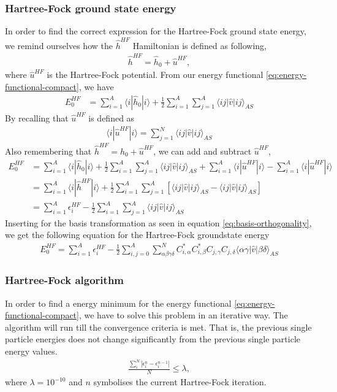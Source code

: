\documentclass[11pt]{article}
\begin{document}
\subsubsection{Hartree-Fock ground state energy}
In order to find the correct expression for the Hartree-Fock ground state energy, we remind ourselves how the $\hat{h}^{HF}$ Hamiltonian is defined as following,
\begin{align*}
	\hat{h}^{HF} = \hat{h}_0 + \hat{u}^{HF},
\end{align*}
where $\hat{u}^{HF}$ is the Hartree-Fock potential. From our energy functional \eqref{eq:energy-functional-compact}, we have
\begin{align*}
	E_0^{HF} &= \sum^A_{i=1} \langle i |\hat{h}_0| i \rangle + \frac{1}{2}\sum^A_{i=1}\sum^A_{j=1} \langle ij |\hat{v}| ij \rangle_{AS}
\end{align*}
By recalling that $\hat{u}^{HF}$ is defined as 
\begin{align*}
	\langle i | \hat{u}^{HF} | i \rangle = \sum_{j=1}^N \langle ij | \hat{v} | ij \rangle_{AS}
\end{align*}
Also remembering that $\hat{h}^{HF} = \hat{h}_0 + \hat{u}^{HF}$, we can add and subtract $\hat{u}^{HF}$,
\begin{align*}
	E_0^{HF} &= \sum^A_{i=1} \langle i |\hat{h}_0| i \rangle + \frac{1}{2}\sum^A_{i=1}\sum^A_{j=1} \langle ij |\hat{v}| ij \rangle_{AS} + \sum^A_{i=1} \langle i | \hat{u}^{HF} | i \rangle - \sum^A_{i=1} \langle i | \hat{u}^{HF} | i \rangle \\
	&= \sum^A_{i=1} \langle i | \hat{h}^{HF} | i \rangle + \frac{1}{2}\sum^A_{i=1}\sum^A_{j=1} \left[ \langle ij |\hat{v}| ij \rangle_{AS} - \langle ij | \hat{v} | ij \rangle_{AS}\right] \\
	&= \sum^A_{i=1} \epsilon_i^{HF} - \frac{1}{2}\sum^A_{i=1}\sum^A_{j=1} \langle ij |\hat{v}| ij \rangle_{AS}
\end{align*}
Inserting for the basis transformation as seen in equation \eqref{eq:basis-orthogonality}, we get the following equation for the Hartree-Fock groundstate energy
\begin{align}
	E_0^{HF} = \sum^A_{i=1} \epsilon^{HF}_i - \frac{1}{2}\sum^A_{i,j=0}\sum^N_{\alpha\beta\gamma\delta} C^*_{i,\alpha} C^*_{i,\beta}C_{j,\gamma}C_{j,\delta}\langle\alpha\gamma|\hat{v}|\beta\delta\rangle_{AS}
	\label{eq:hartree-fock-gs-energy}
\end{align}

\subsubsection{Hartree-Fock algorithm}
In order to find a energy minimum for the energy functional \eqref{eq:energy-functional-compact}, we have to solve this problem in an iterative way. The algorithm will run till the convergence criteria is met. That is, the previous single particle energies does not change significantly from the previous single particle energy values.
\begin{align}
	\frac{\sum_i^N|\epsilon^{n}_i - \epsilon^{n-1}_i|}{N} \leq \lambda,
	\label{eq:convergence-criteria}
\end{align}
where $\lambda=10^{-10}$ and $n$ symbolises the current Hartree-Fock iteration.
\end{document}
